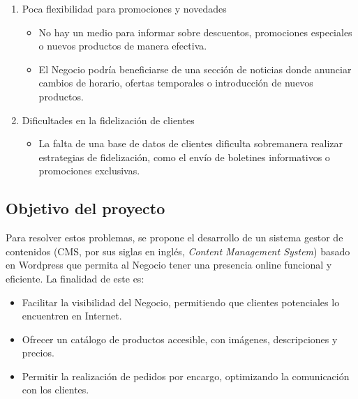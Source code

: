 \documentclass[a4paper]{article}
\begin{document}
\begin{enumerate}
\begin{itemize}
    \end{itemize}


    \item Poca flexibilidad para promociones y novedades
    \begin{itemize}

        \item No hay un medio para informar sobre descuentos, promociones especiales o nuevos productos de manera efectiva.

        \item El Negocio podría beneficiarse de una sección de noticias donde anunciar cambios de horario, ofertas temporales o introducción de nuevos productos.

    \end{itemize}


    \item Dificultades en la fidelización de clientes
    \begin{itemize}

        \item La falta de una base de datos de clientes dificulta sobremanera realizar estrategias de fidelización, como el envío de boletines informativos o promociones exclusivas.

    \end{itemize}

\end{enumerate}



\subsection{Objetivo del proyecto}

Para resolver estos problemas, se propone el desarrollo de un sistema gestor de contenidos (CMS, por sus siglas en inglés, \textit{Content Management System}) basado en Wordpress que permita al Negocio tener una presencia online funcional y eficiente. La finalidad de este es:

\begin{itemize}

    \item Facilitar la visibilidad del Negocio, permitiendo que clientes potenciales lo encuentren en Internet.
    
    \item Ofrecer un catálogo de productos accesible, con imágenes, descripciones y precios.

    \item Permitir la realización de pedidos por encargo, optimizando la comunicación con los clientes.

\end{itemize}
\end{document}
